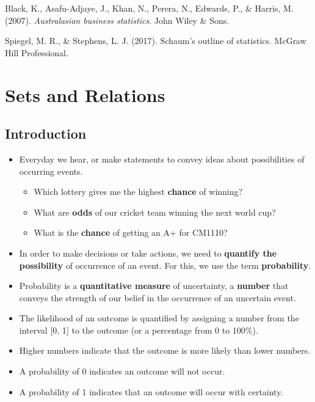 \documentclass[]{book}
\providecommand{\tightlist}{%
  \setlength{\itemsep}{0pt}\setlength{\parskip}{0pt}}
\begin{document}
Black, K., Asafu-Adjaye, J., Khan, N., Perera, N., Edwards, P., \& Harris, M. (2007). \emph{Australasian business statistics}. John Wiley \& Sons.

Spiegel, M. R., \& Stephens, L. J. (2017). Schaum's outline of statistics. McGraw Hill Professional.

\hypertarget{sets-and-relations}{%
\chapter{Sets and Relations}\label{sets-and-relations}}


\hypertarget{introduction}{%
\section{Introduction}\label{introduction}}

\begin{itemize}
\tightlist
\item
  Everyday we hear, or make statements to convey ideas about possibilities of occurring events.

  \begin{itemize}
  \tightlist
  \item
    Which lottery gives me the highest \textbf{chance} of winning?
  \item
    What are \textbf{odds} of our cricket team winning the next world cup?
  \item
    What is the \textbf{chance} of getting an A+ for CM1110?
  \end{itemize}
\item
  In order to make decisions or take actions, we need to \textbf{quantify the possibility} of occurrence of an event. For this, we use the term \textbf{probability}.
\item
  Probability is a \textbf{quantitative measure} of uncertainty, a \textbf{number} that conveys the strength of our belief in the occurrence of an uncertain event.
\item
  The likelihood of an outcome is quantified by assigning a number from the interval {[}0, 1{]} to the outcome (or a percentage from 0 to 100\%).
\item
  Higher numbers indicate that the outcome is more likely than lower numbers.
\item
  A probability of 0 indicates an outcome will not occur.
\item
  A probability of 1 indicates that an outcome will occur with certainty.
\end{itemize}
\end{document}
